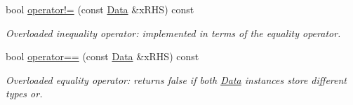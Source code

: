 \begin{DoxyCompactItemize}
\item 
\hypertarget{class_k_g_e_1_1_data_a8333dd8ae22ac619712adbdb83c09800}{bool \hyperlink{class_k_g_e_1_1_data_a8333dd8ae22ac619712adbdb83c09800}{operator!=} (const \hyperlink{class_k_g_e_1_1_data}{Data} \&x\-R\-H\-S) const }\label{class_k_g_e_1_1_data_a8333dd8ae22ac619712adbdb83c09800}

\begin{DoxyCompactList}\small\item\em Overloaded inequality operator\-: implemented in terms of the equality operator. \end{DoxyCompactList}\item 
\hypertarget{class_k_g_e_1_1_data_ae2b3bf0593f3d9559204ed12b105c7c5}{bool \hyperlink{class_k_g_e_1_1_data_ae2b3bf0593f3d9559204ed12b105c7c5}{operator==} (const \hyperlink{class_k_g_e_1_1_data}{Data} \&x\-R\-H\-S) const }\label{class_k_g_e_1_1_data_ae2b3bf0593f3d9559204ed12b105c7c5}

\begin{DoxyCompactList}\small\item\em Overloaded equality operator\-: returns false if both \hyperlink{class_k_g_e_1_1_data}{Data} instances store different types or. \end{DoxyCompactList}\end{DoxyCompactItemize}
